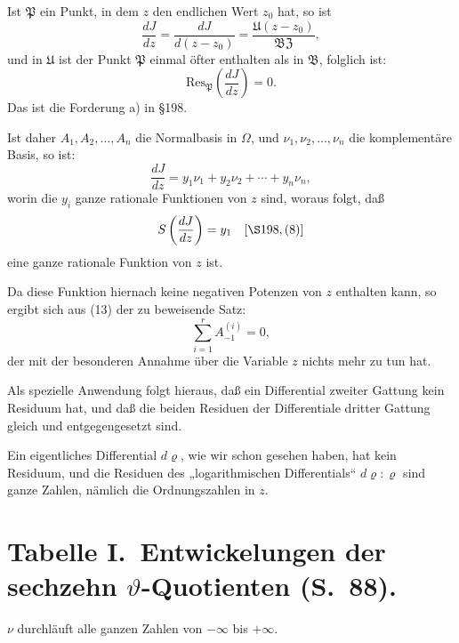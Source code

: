 \documentclass[12pt,a4paper]{article}
\begin{document}
Ist $\mathfrak{P}$ ein Punkt, in dem $z$ den endlichen Wert $z_0$ hat, so ist
\[
\frac{dJ}{dz} = \frac{dJ}{d(z-z_0)} = \frac{\mathfrak{U}(z-z_0)}{\mathfrak{B}\mathfrak{Z}},
\]
und in $\mathfrak{U}$ ist der Punkt $\mathfrak{P}$ einmal öfter enthalten als in $\mathfrak{B}$, folglich ist:
\begin{equation}\label{eq:201-15}
\text{Res}_{\mathfrak{P}}\left(\frac{dJ}{dz}\right) = 0.
\end{equation}
Das ist die Forderung a) in \S 198.

Ist daher $A_1, A_2, \ldots, A_n$ die Normalbasis in $\Omega$, und $\nu_1, \nu_2, \ldots, \nu_n$ die komplementäre Basis, so ist:
\begin{equation}\label{eq:201-16}
\frac{dJ}{dz} = y_1 \nu_1 + y_2 \nu_2 + \cdots + y_n \nu_n,
\end{equation}
worin die $y_i$ ganze rationale Funktionen von $z$ sind, woraus folgt, daß
\begin{equation}\label{eq:201-17}
S\left(\frac{dJ}{dz}\right) = y_1 \quad [\S 198, (8)]
\end{equation}
eine ganze rationale Funktion von $z$ ist.

Da diese Funktion hiernach keine negativen Potenzen von $z$ enthalten kann, so ergibt sich aus (13) der zu beweisende Satz:
\[
\sum_{i=1}^r A_{-1}^{(i)} = 0,
\]
der mit der besonderen Annahme über die Variable $z$ nichts mehr zu tun hat.

Als spezielle Anwendung folgt hieraus, daß ein Differential zweiter Gattung kein Residuum hat, und daß die beiden Residuen der Differentiale dritter Gattung gleich und entgegengesetzt sind.

Ein eigentliches Differential $d\varrho$, wie wir schon gesehen haben, hat kein Residuum, und die Residuen des „logarithmischen Differentials`` $d\varrho:\varrho$ sind ganze Zahlen, nämlich die Ordnungszahlen in $z$.

\newpage
\section*{Tabelle I.\ Entwickelungen der sechzehn $\vartheta$-Quotienten (S.~88).}

$\nu$ durchläuft alle ganzen Zahlen von $-\infty$ bis $+\infty$.
\end{document}
